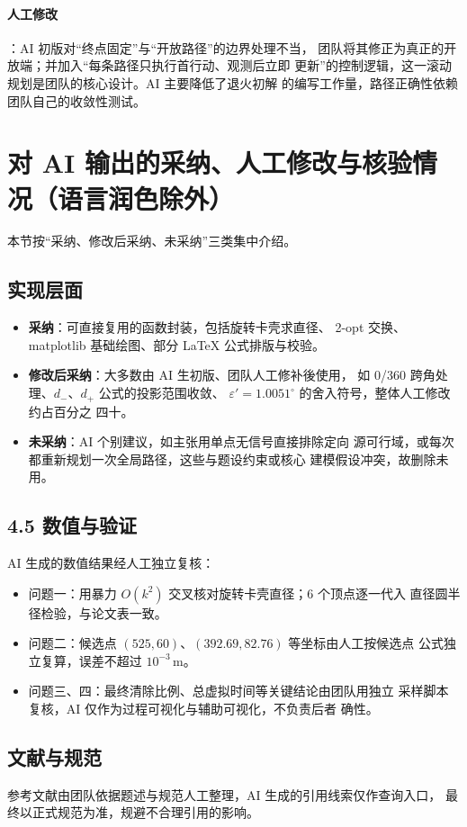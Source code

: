 \documentclass[UTF8,a4paper,12pt]{ctexart}
\begin{document}
\paragraph{人工修改}：AI 初版对“终点固定”与“开放路径”的边界处理不当，
团队将其修正为真正的开放端；并加入“每条路径只执行首行动、观测后立即
更新”的控制逻辑，这一滚动规划是团队的核心设计。AI 主要降低了退火初解
的编写工作量，路径正确性依赖团队自己的收敛性测试。

\section{对 AI 输出的采纳、人工修改与核验情况（语言润色除外）}

本节按“采纳、修改后采纳、未采纳”三类集中介绍。

\subsection{实现层面}
\begin{itemize}
  \item \textbf{采纳}：可直接复用的函数封装，包括旋转卡壳求直径、
        2-opt 交换、matplotlib 基础绘图、部分 LaTeX 公式排版与校验。
  \item \textbf{修改后采纳}：大多数由 AI 生初版、团队人工修补後使用，
        如 0/360 跨角处理、$d_-$、$d_+$ 公式的投影范围收敛、
        $\varepsilon'=1.0051^\circ$ 的舍入符号，整体人工修改约占百分之
        四十。
  \item \textbf{未采纳}：AI 个别建议，如主张用单点无信号直接排除定向
        源可行域，或每次都重新规划一次全局路径，这些与题设约束或核心
        建模假设冲突，故删除未用。
\end{itemize}

\subsection{4.5 数值与验证}
AI 生成的数值结果经人工独立复核：
\begin{itemize}
  \item 问题一：用暴力 $O(k^2)$ 交叉核对旋转卡壳直径；6 个顶点逐一代入
       直径圆半径检验，与论文表一致。
  \item 问题二：候选点 $(525,60)$、$(392.69,82.76)$ 等坐标由人工按候选点
        公式独立复算，误差不超过 $10^{-3}\,\mathrm{m}$。
  \item 问题三、四：最终清除比例、总虚拟时间等关键结论由团队用独立
        采样脚本复核，AI 仅作为过程可视化与辅助可视化，不负责后者
        确性。
\end{itemize}

\subsection{文献与规范}
参考文献由团队依据题述与规范人工整理，AI 生成的引用线索仅作查询入口，
最终以正式规范为准，规避不合理引用的影响。
\end{document}
